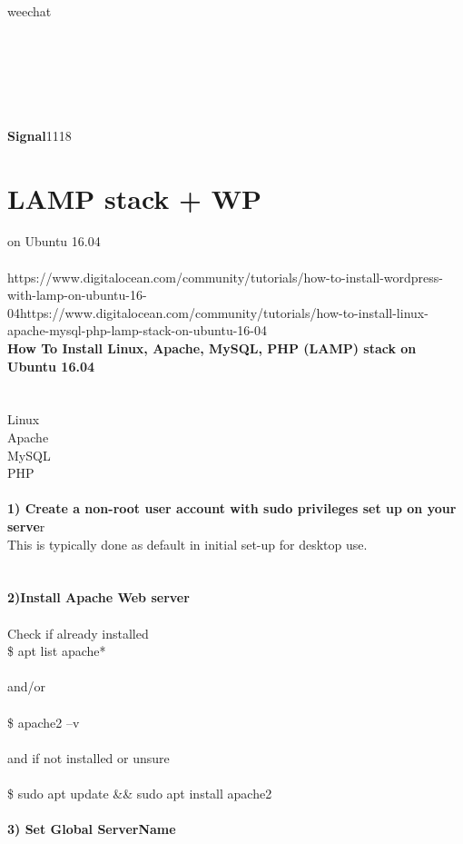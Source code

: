 \documentclass[10pt,a4paper]{article}
\begin{document}
{{{{{{{{{{{{{{{\\
weechat\\
\\
\\
\\
\\
\\
\\
\textbf{Signal}1118
\hypertarget{lamp_stack_+_wp}{\section {LAMP stack + WP}}
{\large on Ubuntu 16.04\\
\\
https://www.digitalocean.com/community/tutorials/how-to-install-wordpress-with-lamp-on-ubuntu-16-04}{\large https://www.digitalocean.com/community/tutorials/how-to-install-linux-apache-mysql-php-lamp-stack-on-ubuntu-16-04}{\large }\textbf{{\Large \\
How To Install Linux, Apache, MySQL, PHP (LAMP) stack on Ubuntu 16.04 }}{\large \\
\\
\\
Linux\\
Apache\\
MySQL\\
PHP\\
\\
\textbf{1) Create a non-root user account with sudo privileges set up on your serve}}{\large r\\
This is typically done as default in initial set-up for desktop use.\\
\\
\\
\textbf{2)Install Apache Web server}}{\large \\
\\
Check if already installed\\
\$ apt list apache*\\
\\
and/or\\
\\
\$ apache2 --v\\
\\
and if not installed or unsure\\
\\
\$ sudo apt update \&\& sudo apt install apache2\\
\\
\textbf{3) Set Global ServerName}}{\large \\
\\
}}}}}}}}}}}}}}}}
\end{document}
